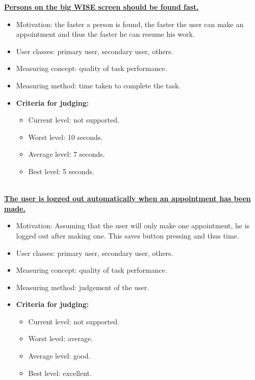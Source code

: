 \documentclass[11pt, a4paper,svglistings]{report}
\begin{document}
\textbf{\underline{Persons on the big WISE screen should be found fast.}}
\begin{itemize}
\item{Motivation: the faster a person is found, the faster the user can make an appointment and thus the faster he can resume his work.}
\item{User classes: primary user, secondary user, others.}
\item{Measuring concept: quality of task performance.}
\item{Measuring method: time taken to complete the task.}
\item{\textbf{Criteria for judging:}}
\begin{itemize}
\item{Current level: not supported.}
\item{Worst level: 10 seconds.}
\item{Average level: 7 seconds.}
\item{Best level: 5 seconds. \\ \\}
\end{itemize}
\end{itemize}
\textbf{\underline{The user is logged out automatically when an appointment has been made.}}
\begin{itemize}
\item{Motivation: Assuming that the user will only make one appointment, he is logged out after making one. This saves button pressing and thus time.}
\item{User classes: primary user, secondary user, others.}
\item{Measuring concept: quality of task performance.}
\item{Measuring method: judgement of the user.}
\item{\textbf{Criteria for judging:}}
\begin{itemize}
\item{Current level: not supported.}
\item{Worst level: average.}
\item{Average level: good.}
\item{Best level: excellent. \\ \\}
\end{itemize}
\end{itemize}
\end{document}
